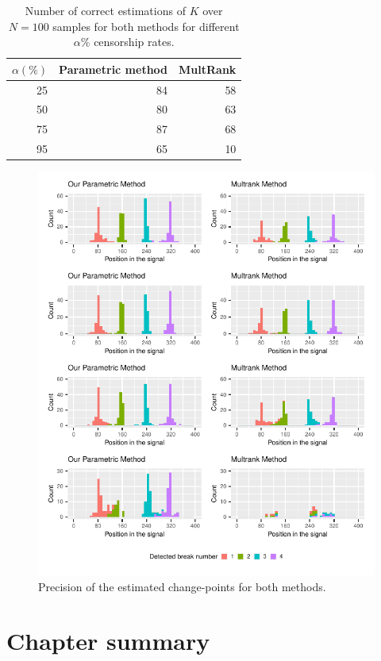 \begin{table}[ht]
\centering
\begin{tabular}{|r|r|r|}
  \hline
   $\alpha(\%)$  & Parametric method & MultRank \\ 
  \hline
 25 &  84 &  58 \\ 
 50 &  80 &  63 \\ 
 75 &  87 &  68 \\ 
 95 &  65 &  10 \\ 
   \hline
\end{tabular}
\caption{Number of correct estimations of $K$ over $N=100$ samples for both methods for different $\alpha\%$ censorship rates.}
\label{tab:simcomp}
\end{table}

\begin{figure}[ht]
    \centering
    \includegraphics{figs/Chap4/detect_comp.pdf}
    \caption{Precision of the estimated change-points for both methods.}
    \label{fig:prec_sim}
\end{figure}

\clearpage

\section{Chapter summary}

